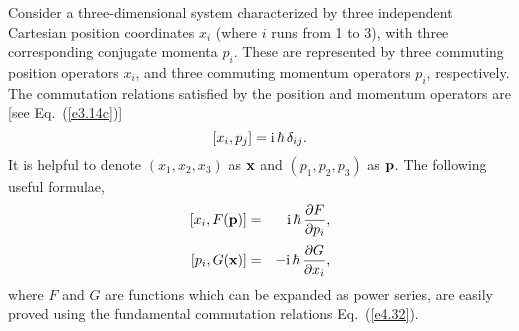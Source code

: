 Consider a three-dimensional system characterized by three independent Cartesian
position coordinates $x_i$ (where $i$ runs from 1 to 3), with three corresponding
conjugate momenta $p_i$. These are represented by three commuting position
operators $x_i$, and three commuting momentum operators $p_i$, respectively. The 
commutation
relations  satisfied by the position and momentum operators
are [see Eq.~(\ref{e3.14c})]
\begin{equation}\label{e4.32}
[x_i, p_j] = {\rm i}\,\hbar\, \delta_{ij}.
\end{equation}
It is helpful to denote $(x_1, x_2, x_3)$ as ${\bf x}$ and $(p_1, p_2, p_3)$ as 
${\bf p}$. The following useful formulae,
\begin{eqnarray}\label{e4.33a}
[x_i, F({\bf p})]& =& {\rm i}\,\hbar \,\frac{\partial F}{\partial p_i},\\[0.5ex]
[p_i, G({\bf x})]& = &- {\rm i}\,\hbar\,\frac{\partial G}{\partial x_i},\label{e4.33b}
\end{eqnarray}
where $F$ and $G$ are functions which can be expanded as  power series, are
easily proved using  the fundamental commutation relations Eq.~(\ref{e4.32}).

